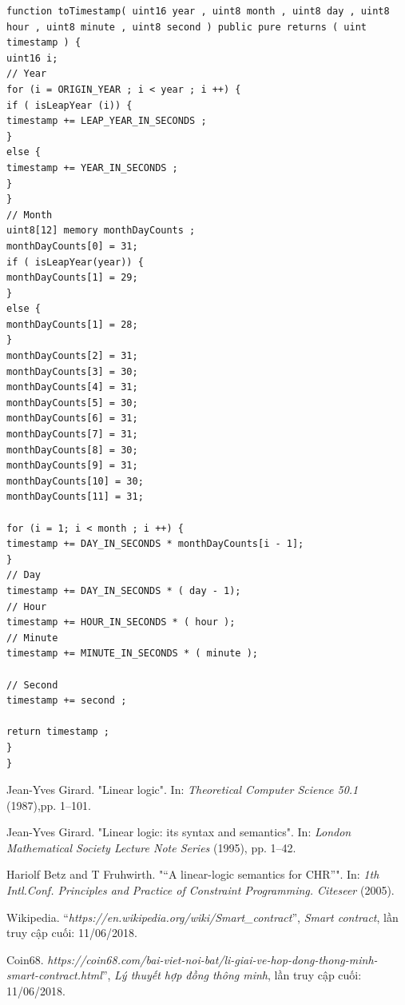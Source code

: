 \documentclass[12pt,a4paper,oneside]{article}
\begin{document}
\begin{lstlisting}
function toTimestamp( uint16 year , uint8 month , uint8 day , uint8 hour , uint8 minute , uint8 second ) public pure returns ( uint timestamp ) {
uint16 i;
// Year
for (i = ORIGIN_YEAR ; i < year ; i ++) {
if ( isLeapYear (i)) {
timestamp += LEAP_YEAR_IN_SECONDS ;
}
else {
timestamp += YEAR_IN_SECONDS ;
}
}
// Month
uint8[12] memory monthDayCounts ;
monthDayCounts[0] = 31;
if ( isLeapYear(year)) {
monthDayCounts[1] = 29;
}
else {
monthDayCounts[1] = 28;
}
monthDayCounts[2] = 31;
monthDayCounts[3] = 30;
monthDayCounts[4] = 31;
monthDayCounts[5] = 30;
monthDayCounts[6] = 31;
monthDayCounts[7] = 31;
monthDayCounts[8] = 30;
monthDayCounts[9] = 31;
monthDayCounts[10] = 30;
monthDayCounts[11] = 31;

for (i = 1; i < month ; i ++) {
timestamp += DAY_IN_SECONDS * monthDayCounts[i - 1];
}
// Day
timestamp += DAY_IN_SECONDS * ( day - 1);
// Hour
timestamp += HOUR_IN_SECONDS * ( hour );
// Minute
timestamp += MINUTE_IN_SECONDS * ( minute );

// Second
timestamp += second ;

return timestamp ;
}
}
\end{lstlisting}


\begin{thebibliography}{80}
	
	
	Jean-Yves Girard. "Linear logic".
	In:\textit{ Theoretical Computer Science 50.1} (1987),pp. 1–101.
	
	Jean-Yves Girard. "Linear logic: its syntax and semantics". In: \textit{London Mathematical	Society Lecture Note Series} (1995), pp. 1–42.
	
	Hariolf Betz and T Fruhwirth.  "“A linear-logic semantics for CHR”". In: \textit{1th Intl.Conf. Principles and Practice of Constraint Programming. Citeseer} (2005).
	
	Wikipedia.	``\textit{https://en.wikipedia.org/wiki/Smart\_contract}'',
	\textit{Smart contract}, lần truy cập cuối: 11/06/2018.
	
	Coin68. \textit{https://coin68.com/bai-viet-noi-bat/li-giai-ve-hop-dong-thong-minh-smart-contract.html}'',
	\textit{Lý thuyết hợp đồng thông minh}, lần truy cập cuối: 11/06/2018.
\end{thebibliography}
\end{document}
